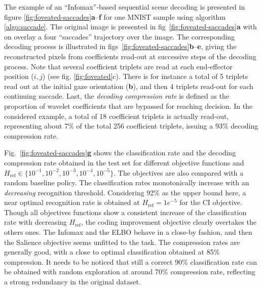 \documentclass{article}
\begin{document}
The example of an ``Infomax''-based sequential scene decoding is presented in figure \ref{fig:foveated-saccades}\textbf{a}--\textbf{f} for one MNIST sample using algorithm \ref{algo:saccade}.
The original image is presented in fig~\ref{fig:foveated-saccades}\textbf{a} with on overlay a four ``saccades'' trajectory over the image. The corresponding decoding process is illustrated in figs~\ref{fig:foveated-saccades}\textbf{b}--\textbf{e}, giving the reconstructed pixels from  coefficients read-out at successive steps of the decoding process.
Note that several coefficient triplets are read at each end-effector position ($i,j$) (see fig. \ref{fig:foveated}c). There is for instance a total of 5 triplets read out at the initial gaze orientation (\textbf{b}), and then 4 triplets read-out for each continuing saccade. 
Last, the \emph{decoding compression rate} is defined as the proportion of wavelet coefficients that are bypassed for reaching decision. In the considered example, a total of 18 coefficient triplets is  actually read-out, representing about 7\% of the total 256 coefficient triplets, issuing a 93\% decoding compression rate. 

Fig.~\ref{fig:foveated-saccades}\textbf{g} shows the classification rate and the decoding compression rate  obtained in the test set for different objective functions and $H_\text{ref} \in \{10^{-1}, 10^{-2}, 10^{-3}, 10^{-4}, 10^{-5}\}$. The objectives are also compared with a random baseline policy. The classification rates monotonically increase with an \emph{decreasing} recognition threshold. Considering 92\% as the upper bound here, a near optimal recognition rate is obtained  at $H_\text{ref}=1e^{-5}$ for the CI objective. Though all objectives functions show a consistent increase of the classification rate with decreasing $H_\text{ref}$, the coding improvement objective clearly overtakes the others ones. The Infomax and the ELBO behave in a close-by fashion, and then the Salience objective seems unfitted to the task. 
The compression rates are generally good, with a close to optimal classification obtained at 85\% compression. It needs to be noticed that still a correct 90\% classification rate can be obtained with random exploration at around 70\% compression rate, reflecting a strong redundancy in the original dataset.  
\end{document}
